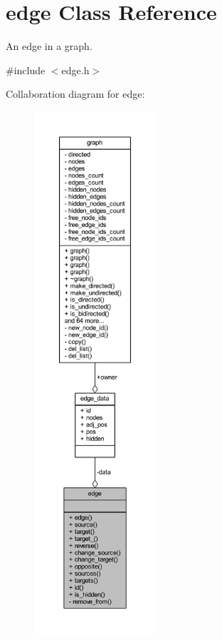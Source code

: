 \hypertarget{classedge}{}\section{edge Class Reference}
\label{classedge}


An edge in a graph.  




{\ttfamily \#include $<$edge.\+h$>$}



Collaboration diagram for edge\+:\nopagebreak
\begin{figure}[H]
\begin{center}
\leavevmode
\includegraphics[height=550pt]{classedge__coll__graph}
\end{center}
\end{figure}
